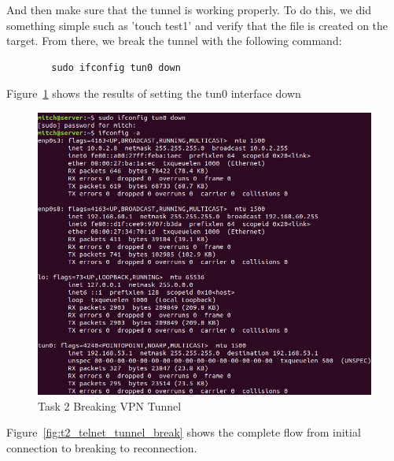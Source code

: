 \documentclass[12pt]{article}
\newcommand\tab[1][0.5cm]{\hspace*{#1}}
\begin{document}
    \tab And then make sure that the tunnel is working properly. To do this, we did something simple such as 'touch test1' and verify that the file is created on the target. From there, we break the tunnel with the following command:
    \begin{verbatim}
        sudo ifconfig tun0 down
    \end{verbatim}
    
    Figure~\ref{fig:t2_breaking_tunnel} shows the results of setting the tun0 interface down

    \begin{figure}[H]
        \begin{center}
            \includegraphics[scale=0.5]{t2_breaking_tunnel.png}
        \end{center}{}
        \caption{Task 2 Breaking VPN Tunnel}
        \label{fig:t2_breaking_tunnel}
    \end{figure}

    Figure~\ref{fig:t2_telnet_tunnel_break} shows the complete flow from initial connection to breaking to reconnection. 
\end{document}
